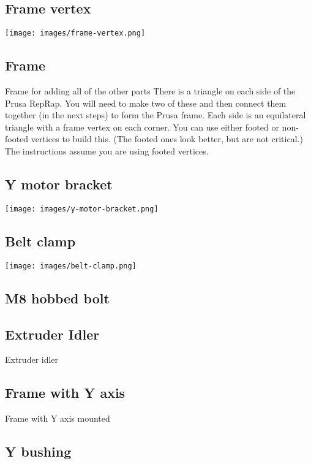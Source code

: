 \documentclass[11pt]{article}
\begin{document}
\hypertarget{thing_frame-vertex}{\subsection{Frame vertex}}
\texttt{[image: images/frame-vertex.png]}

\hypertarget{thing_frame}{\subsection{Frame}}
Frame for adding all of the other parts
There is a triangle on each side of the Prusa RepRap. You will need to make two of these and then connect them together (in the next steps) to form the Prusa frame. Each side is an equilateral triangle with a frame vertex on each corner. You can use either footed or non-footed vertices to build this. (The footed ones look better, but are not critical.) The instructions assume you are using footed vertices.

\hypertarget{thing_y-motor-bracket}{\subsection{Y motor bracket}}
\texttt{[image: images/y-motor-bracket.png]}

\hypertarget{thing_belt-clamp}{\subsection{Belt clamp}}
\texttt{[image: images/belt-clamp.png]}

\hypertarget{thing_hobbed-bolt}{\subsection{M8 hobbed bolt}}

\hypertarget{thing_idler}{\subsection{Extruder Idler}}
Extruder idler

\hypertarget{thing_frame-with-y}{\subsection{Frame with Y axis}}
Frame with Y axis mounted

\hypertarget{thing_y-bushing}{\subsection{Y bushing}}
\end{document}
